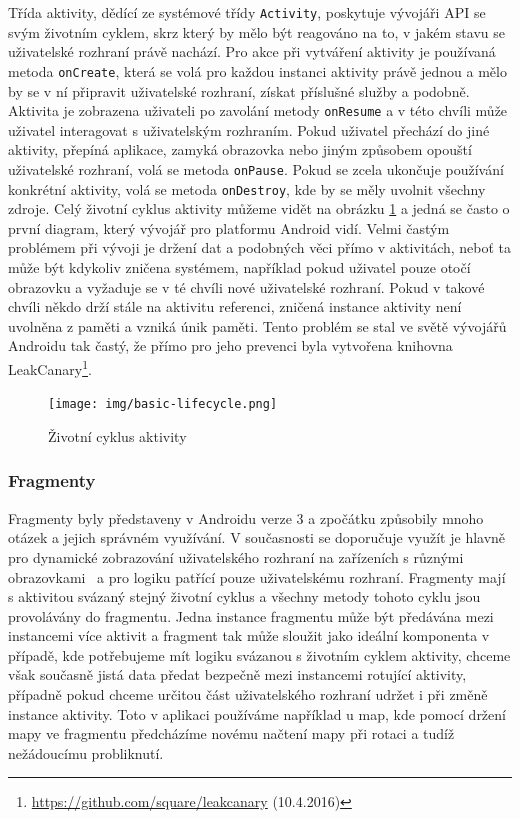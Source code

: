 \documentclass[czech,master,public,dept460,male,java,cpdeclaration]{diploma}
\begin{document}
 Třída aktivity, dědící ze systémové třídy \texttt{Activity},
 poskytuje vývojáři API se svým životním cyklem, skrz který by mělo být reagováno na to, v jakém
stavu se uživatelské rozhraní právě nachází. Pro akce při vytváření aktivity je používaná metoda
\texttt{onCreate}, která se volá pro každou instanci aktivity právě jednou a mělo by se v ní připravit
uživatelské rozhraní, získat příslušné služby a podobně. Aktivita je zobrazena uživateli po zavolání metody
\texttt{onResume} a v této chvíli může uživatel interagovat s uživatelským rozhraním. Pokud uživatel
přechází do jiné aktivity, přepíná aplikace, zamyká obrazovka nebo jiným způsobem opouští uživatelské
rozhraní, volá se metoda \texttt{onPause}. Pokud se zcela ukončuje používání konkrétní aktivity,
volá se metoda \texttt{onDestroy}, kde by se měly uvolnit všechny zdroje.
Celý životní cyklus aktivity můžeme vidět na obrázku \ref{fig:activitylyfecycle} a jedná se
často o první diagram, který vývojář pro platformu Android vidí.
Velmi častým problémem při vývoji je držení dat a podobných věci přímo v aktivitách,
neboť ta může být kdykoliv zničena systémem, například
pokud uživatel pouze otočí obrazovku a vyžaduje se v té chvíli nové uživatelské rozhraní. Pokud v takové chvíli
někdo drží stále na aktivitu referenci, zničená instance aktivity není uvolněna z paměti a vzniká únik paměti.
Tento problém se stal ve světě vývojářů Androidu tak častý, že přímo pro jeho prevenci byla vytvořena knihovna
LeakCanary\footnote{\url{https://github.com/square/leakcanary} (10.4.2016)}.
\begin{figure}[H]
        \centering
                \texttt{[image: img/basic-lifecycle.png]}
        \caption{Životní cyklus aktivity}
        \label{fig:activitylyfecycle}
\end{figure}

\subsubsection{Fragmenty}
Fragmenty byly představeny v Androidu verze 3 a zpočátku způsobily mnoho otázek a jejich správném využívání.
V současnosti se doporučuje využít je hlavně pro dynamické zobrazování uživatelského rozhraní na
zařízeních s různými obrazovkami~\cite{androiddevelopers} a pro logiku patřící pouze uživatelskému rozhraní.
Fragmenty mají s aktivitou svázaný stejný životní cyklus
a všechny metody tohoto cyklu jsou provolávány do fragmentu. Jedna instance fragmentu
může být předávána mezi instancemi více aktivit a fragment tak může sloužit jako ideální komponenta
v případě, kde potřebujeme mít logiku svázanou s životním cyklem aktivity, chceme však současně jistá data
předat bezpečně mezi instancemi rotující aktivity, případně pokud chceme určitou část uživatelského
rozhraní udržet i při změně instance aktivity. Toto v aplikaci používáme například u map, kde pomocí
držení mapy ve fragmentu předcházíme novému načtení mapy při rotaci a tudíž nežádoucímu probliknutí.
\end{document}

